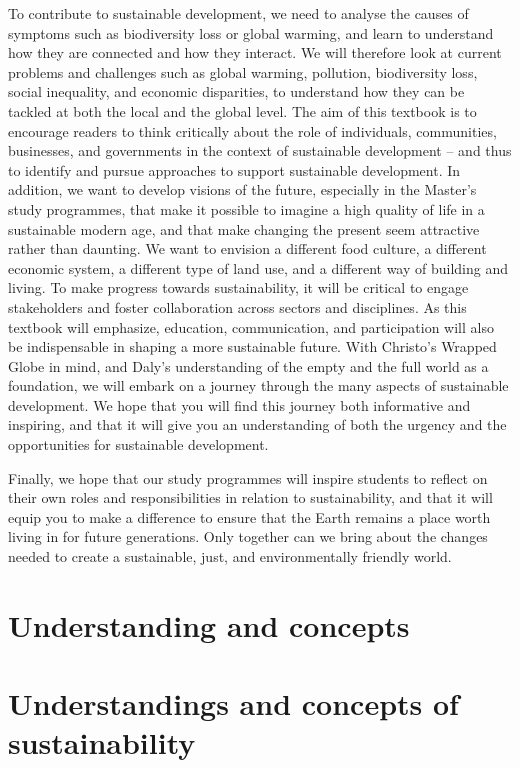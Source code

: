 \documentclass[
  letterpaper,
  DIV=11,
  numbers=noendperiod]{scrreprt}
\begin{document}
To contribute to sustainable development, we need to analyse the causes
of symptoms such as biodiversity loss or global warming, and learn to
understand how they are connected and how they interact. We will
therefore look at current problems and challenges such as global
warming, pollution, biodiversity loss, social inequality, and economic
disparities, to understand how they can be tackled at both the local and
the global level. The aim of this textbook is to encourage readers to
think critically about the role of individuals, communities, businesses,
and governments in the context of sustainable development -- and thus to
identify and pursue approaches to support sustainable development. In
addition, we want to develop visions of the future, especially in the
Master's study programmes, that make it possible to imagine a high
quality of life in a sustainable modern age, and that make changing the
present seem attractive rather than daunting. We want to envision a
different food culture, a different economic system, a different type of
land use, and a different way of building and living. To make progress
towards sustainability, it will be critical to engage stakeholders and
foster collaboration across sectors and disciplines. As this textbook
will emphasize, education, communication, and participation will also be
indispensable in shaping a more sustainable future. With Christo's
Wrapped Globe in mind, and Daly's understanding of the empty and the
full world as a foundation, we will embark on a journey through the many
aspects of sustainable development. We hope that you will find this
journey both informative and inspiring, and that it will give you an
understanding of both the urgency and the opportunities for sustainable
development.

Finally, we hope that our study programmes will inspire students to
reflect on their own roles and responsibilities in relation to
sustainability, and that it will equip you to make a difference to
ensure that the Earth remains a place worth living in for future
generations. Only together can we bring about the changes needed to
create a sustainable, just, and environmentally friendly world.

\part{Understanding and concepts}

\part{Understandings and concepts of sustainability}
\end{document}
